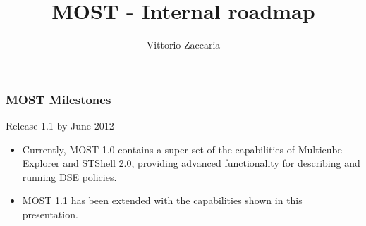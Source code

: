 \documentclass[english,t,ignorenonframetext,xcolor=table]{beamer}
\title[MOST]{
MOST - Internal roadmap
}
\author[V.~Zaccaria]{
Vittorio Zaccaria
}
\institute[] {
Confidential \\
DEI - Politecnico di Milano, Italy
}
\date[\today]{}
\newcommand{\arch}{\boldsymbol{x}}
\newcommand{\energy}{{\eta}(\arch)}
\newcommand{\delay}{{\tau}(\arch)}
\begin{document}
\begin{frame}[label=cover]

	\titlepage
%	
%
\end{frame}

\def\hilite<#1>{%
	\temporal<#1>{\color{gray}}{\color{black}}{\color{black}}}
%
%

\begin{frame}
\frametitle{MOST Milestones}
\begin{block}{}
    \begin{center}
 	Release 1.1 by June 2012
    \end{center}
\end{block}

\begin{itemize}
 \item Currently, MOST 1.0 contains a super-set of the capabilities of Multicube Explorer and STShell 2.0, providing advanced functionality for describing and running DSE policies.
 \item MOST 1.1 has been extended with the capabilities shown in this presentation.
\end{itemize}


\end{frame}
\end{document}
